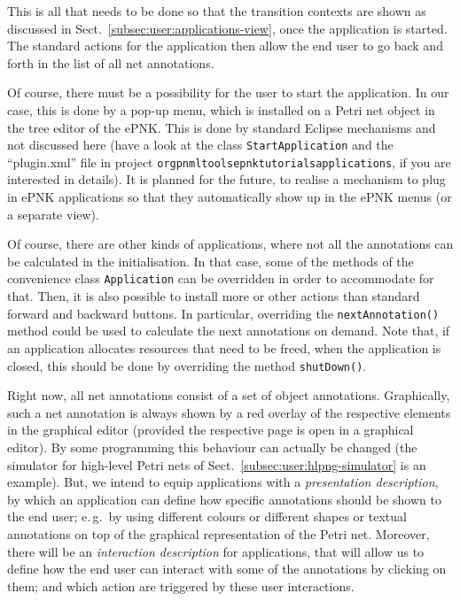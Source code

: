 This is all that needs to be done so that the transition contexts are shown
as discussed in Sect.~\ref{subsec:user:applications-view}, once the
application is started. The standard actions for the application then allow the
end user to go back and forth in the list of all net annotations.

Of course, there must be a possibility for the user to start the application. In
our case, this is done by a pop-up menu, which is installed on a Petri net object in the tree
editor of the ePNK. This is done by standard Eclipse mechanisms and not discussed
here (have a look at the class {\tt StartApplication} and the ``plugin.xml'' file
in project
{\tt org\qnsep{}pnml\qnsep{}tools\qnsep{}epnk\qnsep{}tutorials\qnsep{}applications},
if you are interested in details). It is planned for the future, to realise a
mechanism to plug in ePNK applications so that they automatically show up in
the ePNK menus (or a separate view).%

Of course, there are other kinds of applications, where not all the annotations
can be calculated in the initialisation. In that case, some of the methods of
the convenience class {\tt Application} can be overridden in order to
accommodate for that. Then, it is also possible to install more or other actions
than standard forward and backward buttons. In particular, overriding the
{\tt nextAnnotation()} method could be used to calculate the next annotations on
demand. Note that, if an application allocates resources that need to be freed,
when the application is closed, this should be done by overriding the method
{\tt shutDown()}.%

Right now, all net annotations consist of a set of object annotations.
Graphically, such a net annotation is always shown by a red overlay of the respective
elements in the graphical editor (provided the respective page is open in a
graphical editor).
By some programming this behaviour can actually be changed (the simulator for
high-level Petri nets of Sect.~\ref{subsec:user:hlpng-simulator} is an example). But, we intend
to equip applications with a \emph{presentation description},%
by which an application can define how specific annotations should be shown to
the end user; e.\,g.\ by using different colours or different shapes or textual
annotations on top of the graphical representation of the Petri net. Moreover,
there will be an \emph{interaction description}%
for applications, that will allow us to define how the end user can interact
with some of the annotations by clicking on them; and which action are
triggered by these user interactions.


